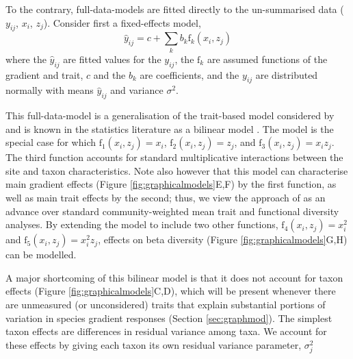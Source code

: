 \documentclass[12pt]{ecology}
\begin{document}
To the contrary, full-data-models are fitted directly to the un-summarised data ($y_{ij}$, $x_i$, $z_j$).  Consider first a fixed-effects model,
\begin{equation}
\hat{y}_{ij} = c + 
	\sum_k b_k \mathrm{f}_k (x_i, z_j)
\label{eq:fixed}
\end{equation}
where the $\hat{y}_{ij}$ are fitted values for the $y_{ij}$, the $\mathrm{f}_k$ are assumed functions of the gradient and trait, $c$ and the $b_k$ are coefficients, and the $y_{ij}$ are distributed normally with means $\hat{y}_{ij}$ and variance $\sigma^2$.

This full-data-model is a generalisation of the trait-based model considered by \citet{CormontEtAl2011} and is known in the statistics literature as a bilinear model \citep{Gabriel1998}.  The \citet{CormontEtAl2011} model is the special case for which $\mathrm{f}_1(x_i, z_j) = x_i$, $\mathrm{f}_2(x_i, z_j) = z_j$, and $\mathrm{f}_3(x_i, z_j) = x_i z_j$.  The third function accounts for standard multiplicative interactions between the site and taxon characteristics.  Note also however that this model can characterise main gradient effects (Figure \ref{fig:graphicalmodels}E,F) by the first function, as well as main trait effects by the second; thus, we view the approach of \citet{CormontEtAl2011} as an advance over standard community-weighted mean trait and functional diversity analyses.  By extending the model to include two other functions, $\mathrm{f}_4(x_i, z_j) = x_i^2$ and $\mathrm{f}_5(x_i, z_j) = x_i^2 z_j$, effects on beta diversity (Figure \ref{fig:graphicalmodels}G,H) can be modelled.


A major shortcoming of this bilinear model is that it does not account for taxon effects (Figure \ref{fig:graphicalmodels}C,D), which will be present whenever there are unmeasured (or unconsidered) traits that explain substantial portions of variation in species gradient responses (Section \ref{sec:graphmod}).  The simplest taxon effects are differences in residual variance among taxa.  We account for these effects by giving each taxon its own residual variance parameter, $\sigma_j^2$
\end{document}
